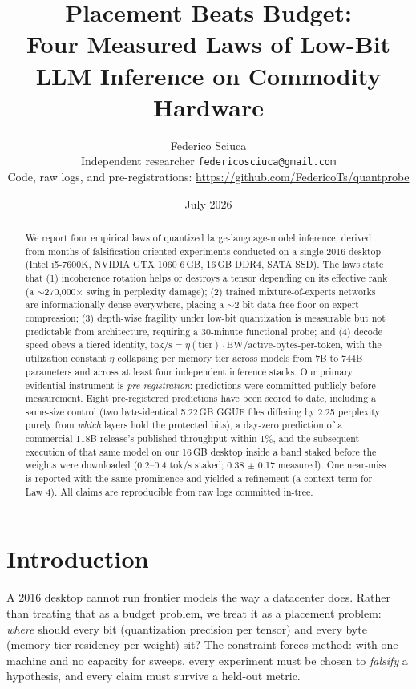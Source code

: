 \documentclass[11pt]{article}
\title{Placement Beats Budget:\\Four Measured Laws of Low-Bit LLM Inference on Commodity Hardware}
\author{Federico Sciuca\\\small Independent researcher \quad \texttt{federicosciuca@gmail.com}\\\small Code, raw logs, and pre-registrations: \url{https://github.com/FedericoTs/quantprobe}}
\date{July 2026}
\begin{document}
\maketitle

\begin{abstract}
We report four empirical laws of quantized large-language-model inference, derived from months of
falsification-oriented experiments conducted on a single 2016 desktop (Intel i5-7600K, NVIDIA GTX
1060 6\,GB, 16\,GB DDR4, SATA SSD). The laws state that (1) incoherence rotation helps or destroys a
tensor depending on its effective rank (a $\sim$270{,}000$\times$ swing in perplexity damage); (2)
trained mixture-of-experts networks are informationally dense everywhere, placing a $\sim$2-bit
data-free floor on expert compression; (3) depth-wise fragility under low-bit quantization is
measurable but not predictable from architecture, requiring a 30-minute functional probe; and (4)
decode speed obeys a tiered identity, $\text{tok/s} = \eta(\text{tier}) \cdot \text{BW} /
\text{active-bytes-per-token}$, with the utilization constant $\eta$ collapsing per memory tier
across models from 7B to 744B parameters and across at least four independent inference stacks.
Our primary evidential instrument is \emph{pre-registration}: predictions were committed publicly
before measurement. Eight pre-registered predictions have been scored to date, including a
same-size control (two byte-identical 5.22\,GB GGUF files differing by 2.25 perplexity purely from
\emph{which} layers hold the protected bits), a day-zero prediction of a commercial 118B release's
published throughput within 1\%, and the subsequent execution of that same model on our 16\,GB
desktop inside a band staked before the weights were downloaded (0.2--0.4 tok/s staked; 0.38 $\pm$
0.17 measured). One near-miss is reported with the same prominence and yielded a refinement (a
context term for Law 4). All claims are reproducible from raw logs committed in-tree.
\end{abstract}

\section{Introduction}
A 2016 desktop cannot run frontier models the way a datacenter does. Rather than treating that as a
budget problem, we treat it as a placement problem: \emph{where} should every bit (quantization
precision per tensor) and every byte (memory-tier residency per weight) sit? The constraint forces
method: with one machine and no capacity for sweeps, every experiment must be chosen to
\emph{falsify} a hypothesis, and every claim must survive a held-out metric.
\end{document}
